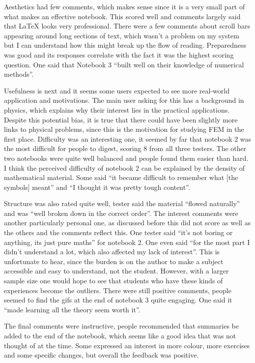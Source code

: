 Aesthetics had few comments, which makes sense since it is a very small part of what makes an effective notebook. This scored well and comments largely said that LaTeX looks very professional. There were a few comments about scroll bars appearing around long sections of text, which wasn't a problem on my system but I can understand how this might break up the flow of reading. Preparedness was good and its responses correlate with the fact it was the highest scoring question. One said that Notebook 3 ``built well on their knowledge of numerical methods''.

Usefulness is next and it seems some users expected to see more real-world application and motivations. The main user asking for this has a background in physics, which explains why their interest lies in the practical applications. Despite this potential bias, it is true that there could have been slightly more links to physical problems, since this is the motivation for studying FEM in the first place. Difficulty was an interesting one, it seemed by far that notebook 2 was the most difficult for people to digest, scoring 8 from all three testers. The other two notebooks were quite well balanced and people found them easier than hard. I think the perceived difficulty of notebook 2 can be explained by the density of mathematical material. Some said ``it became difficult to remember what [the symbols] meant'' and ``I thought it was pretty tough content''.

Structure was also rated quite well, tester said the material ``flowed naturally'' and was ``well broken down in the correct order''. The interest comments were another particularly personal one, as discussed before this did not score as well as the others and the comments reflect this. One tester said ``it's not boring or anything, its just pure maths'' for notebook 2. One even said ``for the most part I didn't understand a lot, which also affected my lack of interest''. This is unfortunate to hear, since the burden is on the author to make a subject accessible and easy to understand, not the student. However, with a larger sample size one would hope to see that students who have these kinds of experiences become the outliers. There were still positive comments, people seemed to find the gifs at the end of notebook 3 quite engaging. One said it ``made learning all the theory seem worth it''.

The final comments were instructive, people recommended that summaries be added to the end of the notebook, which seems like a good idea that was not thought of at the time. Some expressed an interest in more colour, more exercises and some specific changes, but overall the feedback was positive.

